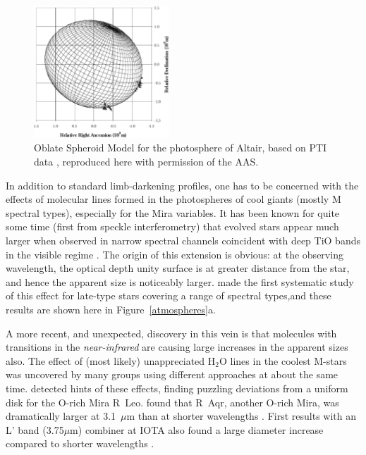 \documentclass[12pt]{article}
\begin{document}
\begin{figure}[tbhp]
\begin{center}
\includegraphics[clip,angle=0,width=2.0in]{Figures/JDM_vanbelle-altair.eps}
\caption{\footnotesize Oblate Spheroid Model for the photosphere
of Altair, based on PTI data  
\citep[from Figure~6 of][]{vanbelle2001}, reproduced here with
permission of the AAS.
\label{altair}}
\end{center}
\end{figure}

In addition to standard limb-darkening profiles, one has to be concerned
with the effects of molecular lines formed in the photospheres of cool
giants (mostly M spectral types), especially for the Mira variables.
It has been known for quite some time (first from speckle
interferometry) that evolved stars appear much larger when observed in
narrow spectral channels coincident with deep TiO bands in the visible
regime \citep[e.g.,][]{labeyrie1977}.  The origin of this extension is
obvious: at the observing wavelength, the optical depth unity surface
is at greater distance from the star, and hence the apparent size is
noticeably larger.  \citet{quirrenbach1993a} made the first systematic
study of this effect for late-type stars covering a range of spectral
types,and these results are shown here in Figure~\ref{atmospheres}a.

A more recent, and unexpected, discovery in this vein is that
molecules with transitions in the {\em near-infrared} are causing
large increases in the apparent sizes also.  The effect of (most
likely) unappreciated H$_2$O lines in the coolest M-stars was
uncovered by many groups using different approaches at about the same
time.  \citet{perrin1999} detected hints of these effects, finding
puzzling deviations from a uniform disk for the O-rich Mira R~Leo.
\citet{tuthill2000b} found that R~Aqr, another O-rich Mira, was
dramatically larger at 3.1~$\mu$m than at shorter wavelengths
\citep[an effect seen also in other O-rich Miras,][]{tuthill1999}.
First results with an L' band (3.75$\mu$m) combiner at IOTA also found
a large diameter increase compared to shorter wavelengths
\citep{mennesson1999}.  
\end{document}
